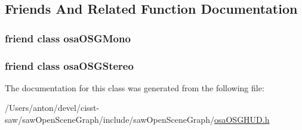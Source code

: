 \subsection{Friends And Related Function Documentation}
\hypertarget{classosa_o_s_g_h_u_d_a634b1c90f4ef3f117b24b0dca82f81b9}{}
\subsubsection[{osa\+O\+S\+G\+Mono}]{\setlength{\rightskip}{0pt plus 5cm}friend class {\bf osa\+O\+S\+G\+Mono}\hspace{0.3cm}{\ttfamily [friend]}}\label{classosa_o_s_g_h_u_d_a634b1c90f4ef3f117b24b0dca82f81b9}
\hypertarget{classosa_o_s_g_h_u_d_a579b6ba3b0d1fba394d73937c399dc67}{}
\subsubsection[{osa\+O\+S\+G\+Stereo}]{\setlength{\rightskip}{0pt plus 5cm}friend class {\bf osa\+O\+S\+G\+Stereo}\hspace{0.3cm}{\ttfamily [friend]}}\label{classosa_o_s_g_h_u_d_a579b6ba3b0d1fba394d73937c399dc67}


The documentation for this class was generated from the following file\+:\begin{DoxyCompactItemize}
\item 
/\+Users/anton/devel/cisst-\/saw/saw\+Open\+Scene\+Graph/include/saw\+Open\+Scene\+Graph/\hyperlink{osa_o_s_g_h_u_d_8h}{osa\+O\+S\+G\+H\+U\+D.\+h}\end{DoxyCompactItemize}
